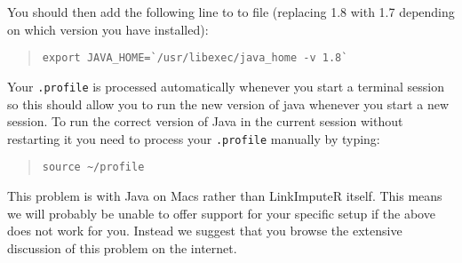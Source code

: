 \documentclass[10pt]{report}
\begin{document}
You should then add the following line to to file (replacing 1.8 with 1.7 depending on which version you have installed):
\begin{quote}
\texttt{export JAVA\_HOME=\`{}/usr/libexec/java\_home -v 1.8\`{}}
\end{quote}

Your \texttt{.profile} is processed automatically whenever you start a terminal session so this should allow you to run the new version of java whenever you start a new session.  To run the correct version of Java in the current session without restarting it you need to process your \texttt{.profile} manually by typing:
\begin{quote}
\texttt{source \textasciitilde/profile}
\end{quote}

This problem is with Java on Macs rather than LinkImputeR itself.  This means we will probably be unable to offer support for your specific setup if the above does not work for you.  Instead we suggest that you browse the extensive discussion of this problem on the internet.
\end{document}
